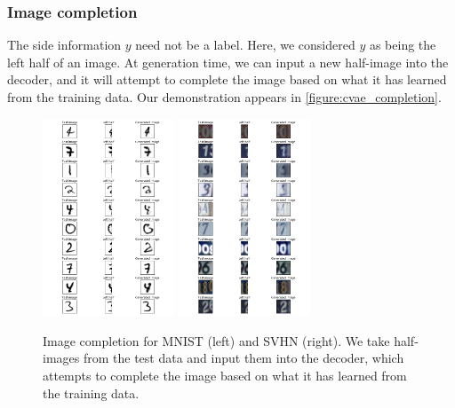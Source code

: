 \documentclass[10pt]{article}
\begin{document}
\subsubsection{Image completion}
The side information $y$ need not be a label. Here, we considered $y$ as being the left half of an image. At generation time, we can input a new half-image into the decoder, and it will attempt to complete the image based on what it has learned from the training data. Our demonstration appears in \autoref{figure:cvae_completion}.
\begin{figure}[!ht]
\centering
\includegraphics[width=0.35\textwidth]{images/left_half.png}
\includegraphics[width=0.35\textwidth]{images/svhn_left_half.png}
\caption{Image completion for MNIST (left) and SVHN (right). We take half-images from the test data and input them into the decoder, which attempts to complete the image based on what it has learned from the training data.}
\label{figure:cvae_completion}
\end{figure}
\end{document}
